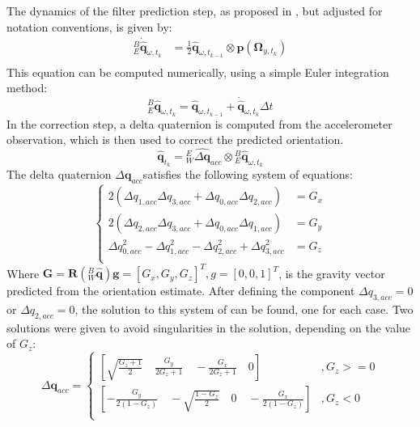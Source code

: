 %
The dynamics of the filter prediction step, as proposed in \cite{Valenti-AQUA}, but adjusted for notation conventions, is given by:
\begin{equation}
	\begin{aligned}
		{}^{B}_{E}\dot{\hat{\boldsymbol{q}}}_{\omega,t_k} & = \frac{1}{2} \hat{\boldsymbol{q}}_{\omega,t_{k - 1}} \otimes \boldsymbol{p}(\boldsymbol{\Omega}_{y,t_k}) \\
	\end{aligned}
\end{equation}
This equation can be computed numerically, using a simple Euler integration method:
\begin{equation}
	{}^{B}_{E}\hat{\boldsymbol{q}}_{\omega,t_k} = \hat{\boldsymbol{q}}_{\omega,t_{k - 1}} + \dot{\hat{\boldsymbol{q}}}_{\omega,t_k} \Delta t
\end{equation}
In the correction step, a delta quaternion is computed from the accelerometer observation, which is then used to correct the predicted orientation.
\begin{equation}
	\hat{\boldsymbol{q}}_{t_k} = {}^{E}_{W}\widehat{\Delta\boldsymbol{q}}_{acc} \otimes {}^{B}_{E}\hat{\boldsymbol{q}}_{\omega,t_k}
\end{equation}
The delta quaternion $\Delta \boldsymbol{q}_{acc}$satisfies the following system of equations:
\begin{equation}
	\begin{cases}
		2(\Delta q_{1, acc}\Delta q_{3, acc} + \Delta q_{0, acc}\Delta q_{2, acc})                & = G_x \\
		2(\Delta q_{2, acc}\Delta q_{3, acc} + \Delta q_{0, acc}\Delta q_{1, acc})                & = G_y \\
		\Delta q_{0, acc}^2 - \Delta q_{1, acc}^2 - \Delta q_{2, acc}^2    +  \Delta q_{3, acc}^2 & = G_z \\
	\end{cases}
\end{equation}
Where $\boldsymbol{G} = \boldsymbol{R}({}^{B}_{W}\hat{\boldsymbol{q}})\boldsymbol{g} = [G_x, G_y, G_z]^T, g = [0, 0, 1]^T$, is the gravity vector predicted from the orientation estimate.
After defining the component $\Delta q_{3, acc} = 0$ or $\Delta q_{2, acc} = 0$, the solution to this system of can be found, one for each case. Two solutions were given to avoid singularities in the solution, depending on the value of $G_z$:
\begin{equation}
	\Delta \boldsymbol{q}_{acc} = \begin{cases}
		[ \sqrt{\frac{G_z + 1}{2}} \quad \frac{G_y}{2G_z + 1} \quad -\frac{G_x}{2G_z + 1} \quad 0 ]  & , G_z >= 0 \\
		[ -\frac{G_y}{2(1-G_z)} \quad -\sqrt{\frac{1-G_z}{2}	} \quad 0 \quad -\frac{G_x}{2(1-G_z)} ] & , G_z < 0  \\
	\end{cases}
\end{equation}
